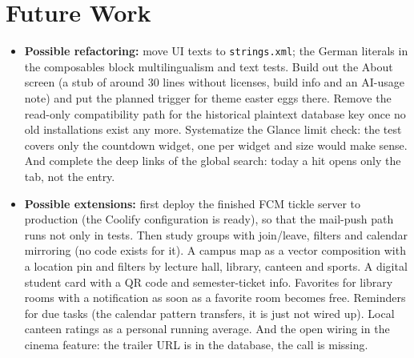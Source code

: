 \documentclass{msereport}
\begin{document}
\msegap

\section{Future Work}

\begin{itemize}
  \item \textbf{Possible refactoring:} move UI texts to \texttt{strings.xml};
        the German literals in the composables block multilingualism and
        text tests. Build out the About screen (a stub of
        around 30 lines without licenses, build info and an AI-usage note) and
        put the planned trigger for theme easter eggs there.
        Remove the read-only compatibility path for the historical
        plaintext database key once no old installations
        exist any more. Systematize the Glance limit check: the test covers
        only the countdown widget, one per widget and size would make sense. And
        complete the deep links of the global search: today a hit opens
        only the tab, not the entry.
  \item \textbf{Possible extensions:} first deploy the finished FCM tickle
        server to production (the Coolify configuration is ready), so that the
        mail-push path runs not only in tests. Then study groups with
        join/leave, filters and calendar mirroring (no code exists for it). A
        campus map as a vector composition with a location pin and filters
        by lecture hall, library, canteen and sports. A digital student card
        with a QR code and semester-ticket info. Favorites for library rooms
        with a notification as soon as a favorite room becomes free. Reminders
        for due tasks (the calendar pattern transfers, it is just not wired up).
        Local canteen ratings as a personal running average. And the open
        wiring in the cinema feature: the trailer URL is in the database, the
        call is missing.
\end{itemize}
\end{document}
